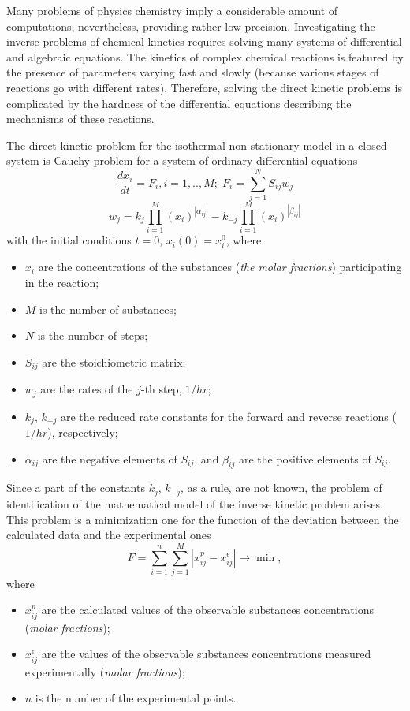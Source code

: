 Many problems of physics chemistry imply a considerable amount of computations, nevertheless, providing rather low precision. Investigating the inverse problems of chemical kinetics requires solving many systems of differential and algebraic equations. The kinetics of complex chemical reactions is featured by the presence of parameters varying fast and slowly (because various stages of reactions go with different rates). Therefore, solving the direct kinetic problems is complicated by the hardness of the differential equations describing the mechanisms of these reactions.

The direct kinetic problem for the isothermal non-stationary model in a closed system is Cauchy problem for a system of ordinary differential equations
\begin{equation} 
 \frac{dx_i}{dt}= F_i, i=1,..,M; \; F_i=\sum_{j=1}^{N}{S_{ij}w_j}
\end{equation}
\begin{equation} 
 w_j=k_j\prod_{i=1}^{M}{\left(x_i\right)^{\left|\alpha_{ij}\right|}}-k_{-j}\prod_{i=1}^{M}{\left(x_i\right)^{\left|\beta_{ij}\right|}}
\end{equation}
with the initial conditions $t=0$, $x_i(0)=x_i^0$, where 
\begin{itemize}
	\item $x_i$ are the concentrations of the substances (\textit{the molar fractions}) participating in the reaction;
	\item $M$ is the number of substances; 
	\item $N$ is the number of steps;
	\item $S_{ij}$ are the stoichiometric matrix; 
	\item $w_j$ are the rates of the $j$-th step, $1/{hr}$; 
	\item $k_j$, $k_{-j}$ are the reduced rate constants for the forward and reverse reactions ($1/{hr}$), respectively;
	\item $\alpha_{ij}$ are the negative elements of $S_{ij}$, and $\beta_{ij}$ are the positive elements of $S_{ij}$.
\end{itemize}

Since a part of the constants $k_j$, $k_{-j}$, as a rule, are not known, the problem of identification of the mathematical model of  the inverse kinetic problem arises. This problem is a minimization one for the function of the deviation between the calculated data and the experimental ones
\begin{equation} \label{8_chem_func}
F=\sum_{i=1}^n{\sum_{j=1}^M{\left|x_{ij}^p-x_{ij}^{\epsilon}\right|}}\rightarrow \min,
\end{equation}
where
\begin{itemize}
	\item $x_{ij}^p$ are the calculated values of the observable substances concentrations  (\textit{molar fractions});	
	\item $x_{ij}^{\epsilon}$ are the values of the observable substances concentrations measured experimentally (\textit{molar fractions});
	\item $n$ is the number of the experimental points.
\end{itemize}


